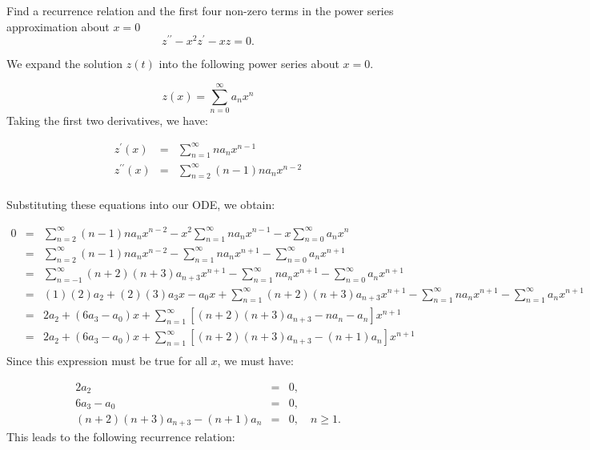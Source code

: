 \documentclass[11pt]{article}
\begin{document}
\begin{problem}
{Find a recurrence relation and the first four non-zero terms in the power series approximation about $x=0$}
\begin{equation*}
z^{\prime \prime} - x^2 z^{\prime} - xz =0.
\end{equation*}
\end{problem}
\begin{solution}
We expand the solution $z(t)$ into the following power series about $x=0$.

\begin{equation*}
z(x) = \sum_{n=0}^{\infty} a_{n} x^n
\end{equation*}
Taking the first two derivatives, we have:

\begin{eqnarray*}
z^{\prime}(x) & = & \sum_{n=1}^{\infty} n a_{n} x^{n-1} \\
z^{\prime \prime}(x) & = & \sum_{n=2}^{\infty} (n-1)n a_{n} x^{n-2} \\
\end{eqnarray*}

Substituting these equations into our ODE, we obtain:

\begin{eqnarray*}
0 & = & \sum_{n=2}^{\infty} (n-1)n a_{n} x^{n-2} - x^2 \sum_{n=1}^{\infty} n a_{n} x^{n-1} - x \sum_{n=0}^{\infty} a_{n} x^n \\
& = & \sum_{n=2}^{\infty} (n-1)n a_{n} x^{n-2} - \sum_{n=1}^{\infty} n a_{n} x^{n+1} -  \sum_{n=0}^{\infty} a_{n} x^{n+1} \\
& = & \sum_{n=-1}^{\infty} (n+2)(n+3) a_{n+3} x^{n+1} - \sum_{n=1}^{\infty} n a_{n} x^{n+1} -  \sum_{n=0}^{\infty} a_{n} x^{n+1} \\
& = & (1)(2)a_{2} + (2)(3)a_{3}x - a_{0}x+ \sum_{n=1}^{\infty} (n+2)(n+3) a_{n+3} x^{n+1} - \sum_{n=1}^{\infty} n a_{n} x^{n+1} -  \sum_{n=1}^{\infty} a_{n} x^{n+1} \\
& = & 2a_{2} + (6a_{3} - a_{0})x+ \sum_{n=1}^{\infty} \left[ (n+2)(n+3) a_{n+3}-n a_{n}-a_{n} \right] x^{n+1}\\
& = & 2a_{2} + (6a_{3} - a_{0})x+ \sum_{n=1}^{\infty} \left[ (n+2)(n+3) a_{n+3}-(n+1)a_{n} \right] x^{n+1}\\
\end{eqnarray*}
Since this expression must be true for all $x$, we must have:

\begin{eqnarray*}
2a_{2} & = & 0, \\
6a_{3} - a_{0} & = & 0, \\
(n+2)(n+3) a_{n+3}-(n+1)a_{n} & = & 0, \quad n\geq 1.
\end{eqnarray*}
This leads to the following recurrence relation:


\end{solution}
\end{document}
